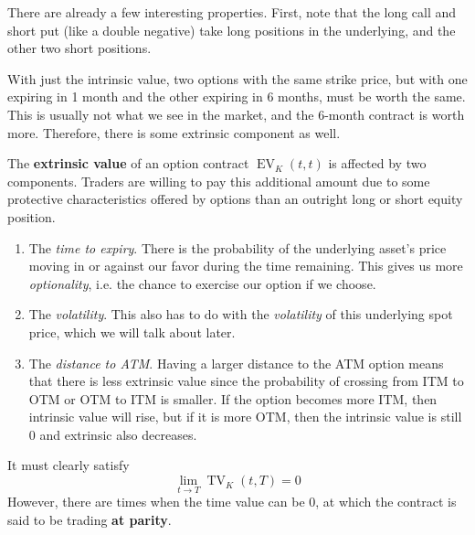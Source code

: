 \documentclass{article}
\DeclareMathOperator{\TV}{TV}
\DeclareMathOperator{\EV}{EV}
\begin{document}
\begin{example}
      There are already a few interesting properties. First, note that the long call and short put (like a double negative) take long positions in the underlying, and the other two short positions. 
    \end{example}

    With just the intrinsic value, two options with the same strike price, but with one expiring in 1 month and the other expiring in 6 months, must be worth the same. This is usually not what we see in the market, and the 6-month contract is worth more. Therefore, there is some extrinsic component as well. 

    \begin{definition}
      The \textbf{extrinsic value} of an option contract $\EV_K(t, t)$ is affected by two components. Traders are willing to pay this additional amount due to some protective characteristics offered by options than an outright long or short equity position. 
      \begin{enumerate}
        \item The \textit{time to expiry}. There is the probability of the underlying asset's price moving in or against our favor during the time remaining. This gives us more \textit{optionality}, i.e. the chance to exercise our option if we choose. 
        \item The \textit{volatility}. This also has to do with the \textit{volatility} of this underlying spot price, which we will talk about later. 
        \item The \textit{distance to ATM}. Having a larger distance to the ATM option means that there is less extrinsic value since the probability of crossing from ITM to OTM or OTM to ITM is smaller. If the option becomes more ITM, then intrinsic value will rise, but if it is more OTM, then the intrinsic value is still $0$ and extrinsic also decreases.  
      \end{enumerate}
      It must clearly satisfy  
      \begin{equation}
        \lim_{t \rightarrow T} \TV_K (t, T) = 0
      \end{equation}
      However, there are times when the time value can be $0$, at which the contract is said to be trading \textbf{at parity}. 
    \end{definition}
\end{document}
